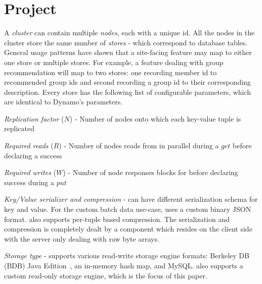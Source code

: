 \section{Project \projectname{}}
\label{sec:system_architecture}

A \projectname{} \emph{cluster} can contain multiple \emph{nodes},
each with a unique id. All the nodes in the cluster store the same
number of \emph{stores} - which correspond to database tables. General
usage patterns have shown that a site-facing feature may map to either
one store or multiple stores. For example, a feature dealing with
group recommendation will map to two stores: one recording member id
to recommended group ids and second recording a group id to their
corresponding description. Every store has the following list of
configurable parameters, which are identical to Dynamo's\cite{dynamo} parameters. 
\begin{compactitem}
  \item \emph {Replication factor} ($N$) - Number of nodes onto which
each key-value tuple is replicated
  \item \emph {Required reads} ($R$) - Number of nodes \projectname{}
reads from in parallel during a $get$ before declaring a success
  \item \emph {Required writes} ($W$) - Number of node responses
\projectname{} blocks for before declaring success during a $put$
  \item \emph {Key/Value serializer and compression} - \projectname{}
can have different serialization schema for key and value. For the
custom batch data use-case, \projectname{} uses a custom binary JSON
format. \projectname{} also supports per-tuple based compression. The
serialization and compression is completely dealt by a component which
resides on the client side with the server only dealing with raw byte
arrays. 
  \item \emph {Storage type} - \projectname{} supports various
read-write storage engine formats: Berkeley DB (BDB) Java
Edition~\cite{bdb}, an in-memory hash map, and MySQL. \projectname{}
also supports a custom read-only storage engine, which is the focus of
this paper.  
\end{compactitem}

